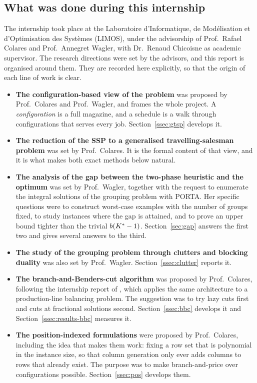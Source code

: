 \subsection{What was done during this internship}\label{ssec:intro-done}

The internship took place at the Laboratoire d'Informatique, de Mod\'elisation et
d'Optimisation des Syst\`emes (LIMOS), under the advisorship of Prof.~Rafael
Colares and Prof.~Annegret Wagler, with Dr.~Renaud Chicoisne as academic
supervisor. The research directions were set by the advisors, and this report is
organised around them. They are recorded here explicitly, so that the origin of
each line of work is clear.

\begin{itemize}[topsep=4pt,itemsep=3pt]
  \item \textbf{The configuration-based view of the problem} was proposed by
  Prof.~Colares and Prof.~Wagler, and frames the whole project. A
  \emph{configuration} is a full magazine, and a schedule is a walk through
  configurations that serves every job. Section~\ref{ssec:gtsp} develops it.

  \item \textbf{The reduction of the SSP to a generalised travelling-salesman
  problem} was set by Prof.~Colares. It is the formal content of that view, and it
  is what makes both exact methods below natural.

  \item \textbf{The analysis of the gap between the two-phase heuristic and the
  optimum} was set by Prof.~Wagler, together with the request to enumerate the
  integral solutions of the grouping problem with PORTA. Her specific questions
  were to construct worst-case examples with the number of groups fixed, to study
  instances where the gap is attained, and to prove an upper bound tighter than the
  trivial $b(K^{\ast}-1)$. Section~\ref{sec:gap} answers the first two and gives
  several answers to the third.

  \item \textbf{The study of the grouping problem through clutters and blocking
  duality} was also set by Prof.~Wagler. Section~\ref{ssec:clutter} reports it.

  \item \textbf{The branch-and-Benders-cut algorithm} was proposed by
  Prof.~Colares, following the internship report of \citet{Kashou2025}, which
  applies the same architecture to a production-line balancing problem. The
  suggestion was to try lazy cuts first and cuts at fractional solutions second.
  Section~\ref{ssec:bbc} develops it and Section~\ref{ssec:results-bbc} measures it.

  \item \textbf{The position-indexed formulations} were proposed by
  Prof.~Colares, including the idea that makes them work: fixing a row set that
  is polynomial in the instance size, so that column generation only ever adds
  columns to rows that already exist. The purpose was to make branch-and-price over
  configurations possible. Section~\ref{ssec:pos} develops them.
\end{itemize}

